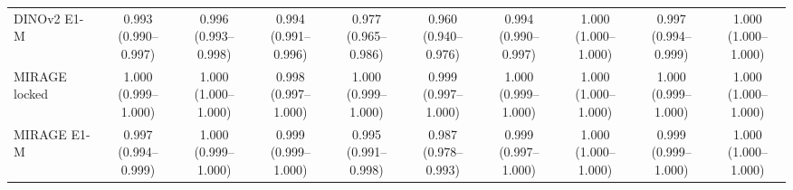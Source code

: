 \begin{tabular}{@{}lccccccccc@{}}
DINOv2 E1-M & \makecell{0.993\\{\scriptsize (0.990--0.997)}} & \makecell{0.996\\{\scriptsize (0.993--0.998)}} & \makecell{0.994\\{\scriptsize (0.991--0.996)}} & \makecell{0.977\\{\scriptsize (0.965--0.986)}} & \makecell{0.960\\{\scriptsize (0.940--0.976)}} & \makecell{0.994\\{\scriptsize (0.990--0.997)}} & \makecell{1.000\\{\scriptsize (1.000--1.000)}} & \makecell{0.997\\{\scriptsize (0.994--0.999)}} & \makecell{1.000\\{\scriptsize (1.000--1.000)}} \\
MIRAGE locked & \makecell{1.000\\{\scriptsize (0.999--1.000)}} & \makecell{1.000\\{\scriptsize (1.000--1.000)}} & \makecell{0.998\\{\scriptsize (0.997--1.000)}} & \makecell{1.000\\{\scriptsize (0.999--1.000)}} & \makecell{0.999\\{\scriptsize (0.997--1.000)}} & \makecell{1.000\\{\scriptsize (0.999--1.000)}} & \makecell{1.000\\{\scriptsize (1.000--1.000)}} & \makecell{1.000\\{\scriptsize (0.999--1.000)}} & \makecell{1.000\\{\scriptsize (1.000--1.000)}} \\
MIRAGE E1-M & \makecell{0.997\\{\scriptsize (0.994--0.999)}} & \makecell{1.000\\{\scriptsize (0.999--1.000)}} & \makecell{0.999\\{\scriptsize (0.999--1.000)}} & \makecell{0.995\\{\scriptsize (0.991--0.998)}} & \makecell{0.987\\{\scriptsize (0.978--0.993)}} & \makecell{0.999\\{\scriptsize (0.997--1.000)}} & \makecell{1.000\\{\scriptsize (1.000--1.000)}} & \makecell{0.999\\{\scriptsize (0.999--1.000)}} & \makecell{1.000\\{\scriptsize (1.000--1.000)}} \\

\end{tabular}
